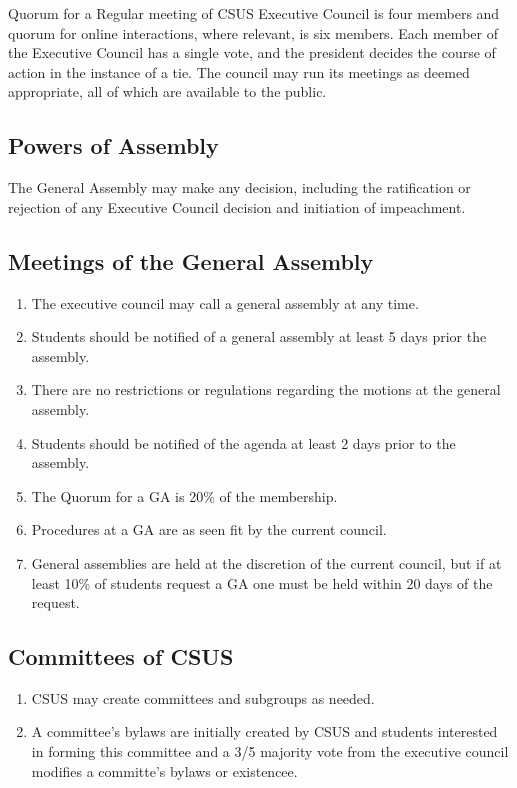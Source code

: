 Quorum for a Regular meeting of CSUS Executive Council is four members
and quorum for online interactions, where relevant, is six members. Each
member of the Executive Council has a single vote, and the president
decides the course of action in the instance of a tie. The council may
run its meetings as deemed appropriate, all of which are available to
the public.

\subsection{Powers of Assembly}\label{powers-of-assembly}

The General Assembly may make any decision, including the ratification
or rejection of any Executive Council decision and initiation of
impeachment.

\subsection{Meetings of the General
Assembly}\label{meetings-of-the-general-assembly}

\begin{enumerate}
\def\labelenumi{\arabic{enumi}.}
\item
  The executive council may call a general assembly at any time.
\item
  Students should be notified of a general assembly at least 5 days
  prior the assembly.
\item
  There are no restrictions or regulations regarding the motions at the
  general assembly.
\item
  Students should be notified of the agenda at least 2 days prior to the
  assembly.
\item
  The Quorum for a GA is 20\% of the membership.
\item
  Procedures at a GA are as seen fit by the current council.
\item
  General assemblies are held at the discretion of the current council,
  but if at least 10\% of students request a GA one must be held within
  20 days of the request.
\end{enumerate}

\subsection{Committees of CSUS}\label{committees-of-csus}

\begin{enumerate}
\def\labelenumi{\arabic{enumi}.}
\item
  CSUS may create committees and subgroups as needed.
\item
  A committee's bylaws are initially created by CSUS and students
  interested in forming this committee and a 3/5 majority vote from the
  executive council modifies a committe's bylaws or existencee.
\end{enumerate}

